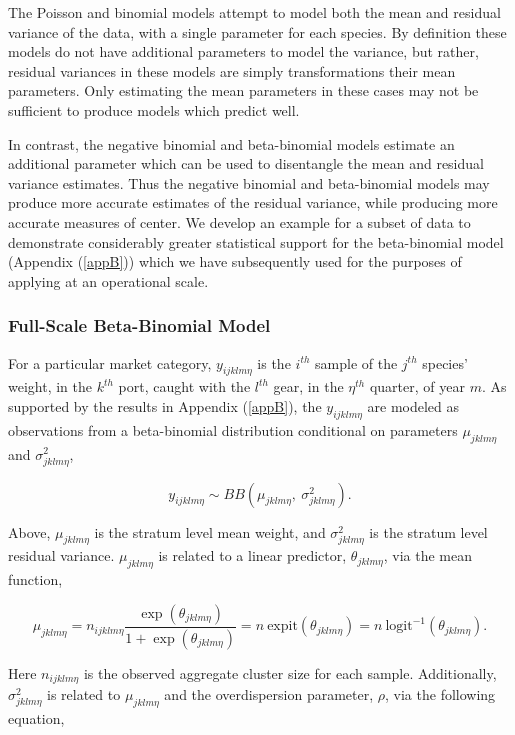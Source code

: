 \documentclass[12pt]{article}
\begin{document}
The Poisson and binomial models attempt to model both the mean and
residual variance of the data, with a single parameter for each species.
By definition these models do not have additional parameters to model
the variance, but rather, residual variances in these models are simply
transformations their mean parameters. Only estimating the mean
parameters in these cases may not be sufficient to produce models which
predict well.

In contrast, the negative binomial and beta-binomial models estimate an
additional parameter which can be used to disentangle the mean and
residual variance estimates. Thus the negative binomial and
beta-binomial models may produce more accurate estimates of the residual
variance, while producing more accurate measures of center. We develop
an example for a subset of data to demonstrate considerably greater
statistical support for the beta-binomial model (Appendix (\ref{appB})) 
which we have subsequently used for the purposes of applying at an 
operational scale.

\subsubsection{Full-Scale Beta-Binomial
Model}\label{full-scale-beta-binomial-model}

For a particular market category, \(y_{ijklm\eta}\) is the \(i^{th}\)
sample of the \(j^{th}\) species' weight, in the \(k^{th}\) port, caught
with the \(l^{th}\) gear, in the \(\eta^{th}\) quarter, of year \(m\).
As supported by the results in Appendix (\ref{appB}), the \(y_{ijklm\eta}\) are
modeled as observations from a beta-binomial distribution conditional on
parameters \(\mu_{jklm\eta}\) and \(\sigma^2_{jklm\eta}\),

\[y_{ijklm\eta} \sim BB(\mu_{jklm\eta},~\sigma^2_{jklm\eta}).\]

Above, \(\mu_{jklm\eta}\) is the stratum level mean weight, and
\(\sigma^2_{jklm\eta}\) is the stratum level residual variance.
\(\mu_{jklm\eta}\) is related to a linear predictor,
\(\theta_{jklm\eta}\), via the mean function,

\[\mu_{jklm\eta} = n_{ijklm\eta}\frac{\exp(\theta_{jklm\eta})}{1+\exp(\theta_{jklm\eta})}=n~\text{expit}(\theta_{jklm\eta})=n~\text{logit}^{-1}(\theta_{jklm\eta}).\]

Here \(n_{ijklm\eta}\) is the observed aggregate cluster size for each
sample. Additionally, \(\sigma^2_{jklm\eta}\) is related to
\(\mu_{jklm\eta}\) and the overdispersion parameter, \(\rho\), via the
following equation,
\end{document}
